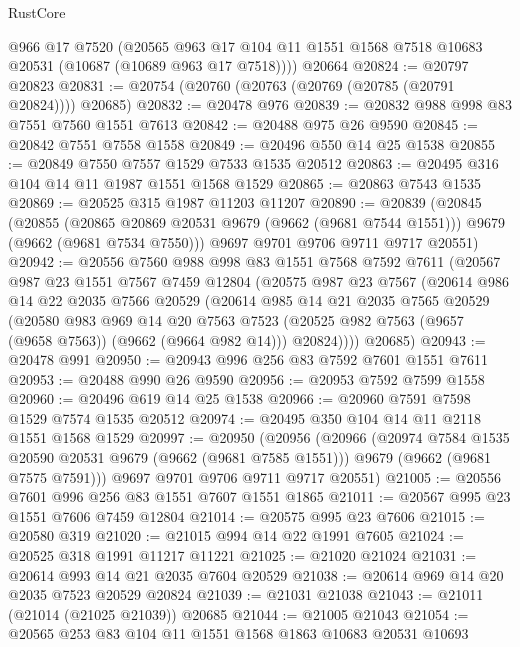 \begin{lexlean}{RustCore}
\begin{coremodule}
      @966
      @17
      @7520
      (@20565 @963 @17 @104 @11 @1551 @1568 @7518 @10683 @20531 (@10687 (@10689 @963 @17 @7518))))
    @20664
@20824 := @20797 @20823
@20831 := @20754 (@20760 (@20763 (@20769 (@20785 (@20791 @20824)))) @20685)
@20832 := @20478 @976
@20839 := @20832 @988 @998 @83 @7551 @7560 @1551 @7613
@20842 := @20488 @975 @26 @9590
@20845 := @20842 @7551 @7558 @1558
@20849 := @20496 @550 @14 @25 @1538
@20855 := @20849 @7550 @7557 @1529 @7533 @1535 @20512
@20863 := @20495 @316 @104 @14 @11 @1987 @1551 @1568 @1529
@20865 := @20863 @7543 @1535
@20869 := @20525 @315 @1987 @11203 @11207
@20890 := @20839
    (@20845
      (@20855
        (@20865 @20869 @20531 @9679 (@9662 (@9681 @7544 @1551)))
        @9679
        (@9662 (@9681 @7534 @7550)))
      @9697
      @9701
      @9706
      @9711
      @9717
      @20551)
@20942 := @20556
    @7560
    @988
    @998
    @83
    @1551
    @7568
    @7592
    @7611
    (@20567
      @987
      @23
      @1551
      @7567
      @7459
      @12804
      (@20575
        @987
        @23
        @7567
        (@20614
          @986
          @14
          @22
          @2035
          @7566
          @20529
          (@20614
            @985
            @14
            @21
            @2035
            @7565
            @20529
            (@20580
              @983
              @969
              @14
              @20
              @7563
              @7523
              (@20525 @982 @7563 (@9657 (@9658 @7563)) (@9662 (@9664 @982 @14)))
              @20824))))
      @20685)
@20943 := @20478 @991
@20950 := @20943 @996 @256 @83 @7592 @7601 @1551 @7611
@20953 := @20488 @990 @26 @9590
@20956 := @20953 @7592 @7599 @1558
@20960 := @20496 @619 @14 @25 @1538
@20966 := @20960 @7591 @7598 @1529 @7574 @1535 @20512
@20974 := @20495 @350 @104 @14 @11 @2118 @1551 @1568 @1529
@20997 := @20950
    (@20956
      (@20966
        (@20974 @7584 @1535 @20590 @20531 @9679 (@9662 (@9681 @7585 @1551)))
        @9679
        (@9662 (@9681 @7575 @7591)))
      @9697
      @9701
      @9706
      @9711
      @9717
      @20551)
@21005 := @20556 @7601 @996 @256 @83 @1551 @7607 @1551 @1865
@21011 := @20567 @995 @23 @1551 @7606 @7459 @12804
@21014 := @20575 @995 @23 @7606
@21015 := @20580 @319
@21020 := @21015 @994 @14 @22 @1991 @7605
@21024 := @20525 @318 @1991 @11217 @11221
@21025 := @21020 @21024
@21031 := @20614 @993 @14 @21 @2035 @7604 @20529
@21038 := @20614 @969 @14 @20 @2035 @7523 @20529 @20824
@21039 := @21031 @21038
@21043 := @21011 (@21014 (@21025 @21039)) @20685
@21044 := @21005 @21043
@21054 := @20565 @253 @83 @104 @11 @1551 @1568 @1863 @10683 @20531 @10693

\end{coremodule}
\end{lexlean}
